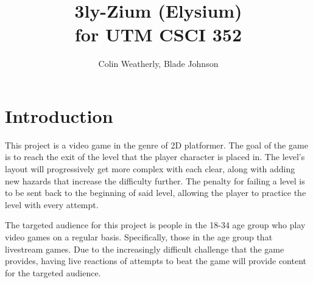 \documentclass[10pt,conference,onecolumn,compsoc]{IEEEtran}
\begin{document}
\title{3ly-Zium (Elysium)\\ for UTM CSCI 352}
%
%


\author{Colin Weatherly, Blade Johnson%
}



\maketitle



\IEEEdisplaynontitleabstractindextext

\IEEEpeerreviewmaketitle



\section{Introduction}



This project is a video game in the genre of 2D platformer. The goal of the game is to reach the exit of the level that the player character is placed in. The level’s layout will progressively get more complex with each clear, along with adding new hazards that increase the difficulty further. The penalty for failing a level is to be sent back to the beginning of said level, allowing the player to practice the level with every attempt.

The targeted audience for this project is people in the 18-34 age group who play video games on a regular basis. Specifically, those in the age group that livestream games. Due to the increasingly difficult challenge that the game provides, having live reactions of attempts to beat the game will provide content for the targeted audience.
\end{document}
